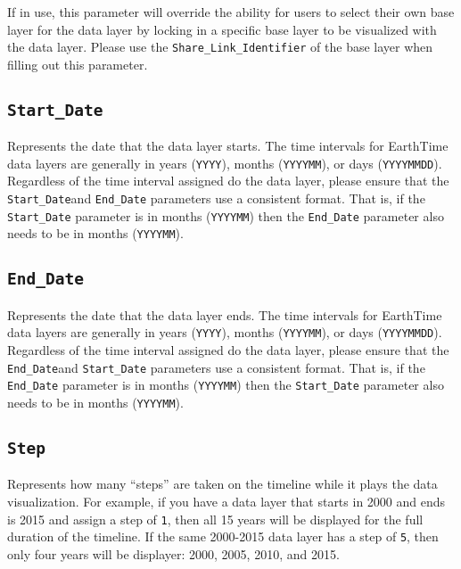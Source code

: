 \documentclass[
]{book}
\begin{document}
If in use, this parameter will override the ability for users to select their own base layer for the data layer by locking in a specific base layer to be visualized with the data layer. Please use the \texttt{Share\_Link\_Identifier} of the base layer when filling out this parameter.

\hypertarget{start_date}{%
\subsection*{\texorpdfstring{\texttt{Start\_Date}}{Start\_Date}}\label{start_date}}


Represents the date that the data layer starts. The time intervals for EarthTime data layers are generally in years (\texttt{YYYY}), months (\texttt{YYYYMM}), or days (\texttt{YYYYMMDD}). Regardless of the time interval assigned do the data layer, please ensure that the \texttt{Start\_Date}and \texttt{End\_Date} parameters use a consistent format. That is, if the \texttt{Start\_Date} parameter is in months (\texttt{YYYYMM}) then the \texttt{End\_Date} parameter also needs to be in months (\texttt{YYYYMM}).

\hypertarget{end_date}{%
\subsection*{\texorpdfstring{\texttt{End\_Date}}{End\_Date}}\label{end_date}}


Represents the date that the data layer ends. The time intervals for EarthTime data layers are generally in years (\texttt{YYYY}), months (\texttt{YYYYMM}), or days (\texttt{YYYYMMDD}). Regardless of the time interval assigned do the data layer, please ensure that the \texttt{End\_Date}and \texttt{Start\_Date} parameters use a consistent format. That is, if the \texttt{End\_Date} parameter is in months (\texttt{YYYYMM}) then the \texttt{Start\_Date} parameter also needs to be in months (\texttt{YYYYMM}).

\hypertarget{step}{%
\subsection*{\texorpdfstring{\texttt{Step}}{Step}}\label{step}}


Represents how many ``steps'' are taken on the timeline while it plays the data visualization. For example, if you have a data layer that starts in 2000 and ends is 2015 and assign a step of \texttt{1}, then all 15 years will be displayed for the full duration of the timeline. If the same 2000-2015 data layer has a step of \texttt{5}, then only four years will be displayer: 2000, 2005, 2010, and 2015.
\end{document}
